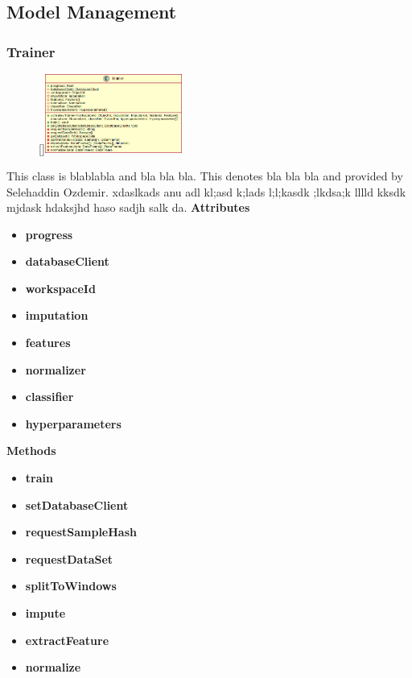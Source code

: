 \subsection{Model Management}

\subsubsection{Trainer}
\begin{figure}
    \raisebox{0pt}[\dimexpr{}\baselineskip\relax]{\includegraphics[width=4.5cm]{classes/model-management/1.png}}
\end{figure} 
\par
This class is blablabla and bla bla bla. This denotes bla bla bla and provided by Selehaddin Ozdemir. xdaslkads anu adl kl;asd k;lads l;l;kasdk ;lkdsa;k lllld kksdk mjdask hdaksjhd haso sadjh salk da.
\newline
\newline
\textbf{Attributes}
\begin{itemize}
    \item \textbf{progress}
    \item \textbf{databaseClient}
    \item \textbf{workspaceId}
    \item \textbf{imputation}
    \item \textbf{features}
    \item \textbf{normalizer}
    \item \textbf{classifier}
    \item \textbf{hyperparameters}
\end{itemize}
\textbf{Methods}
\begin{itemize}
    \item \textbf{train}
    \item \textbf{setDatabaseClient}
    \item \textbf{requestSampleHash}
    \item \textbf{requestDataSet}
    \item \textbf{splitToWindows}
    \item \textbf{impute}
    \item \textbf{extractFeature}
    \item \textbf{normalize}
\end{itemize}

